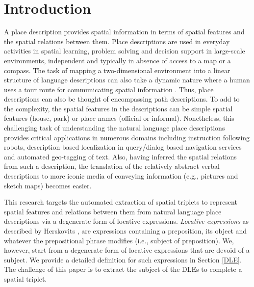 \documentclass{acm_proc_article-sp}
\begin{document}
\section{Introduction}
A place description provides spatial information in terms of spatial features and the spatial relations between them. Place descriptions are used in everyday activities in spatial learning, problem solving and decision support in large-scale environments, independent and typically in absence of access to a map or a compass. The task of mapping a two-dimensional environment into a linear structure of language descriptions can also take a dynamic nature where a human uses a tour route for communicating spatial information \cite{linde:spatial, daniel:modes}. Thus, place descriptions can also be thought of encompassing path descriptions. To add to the complexity, the spatial features in the descriptions can be simple spatial features (house, park) or place names (official or informal). Nonetheless, this challenging task of understanding the natural language place descriptions provides critical applications in numerous domains including instruction following robots, description based localization in query/dialog based navigation services and automated geo-tagging of text. Also, having inferred the spatial relations from such a description, the translation of the relatively abstract verbal descriptions to more iconic media of conveying information (e.g., pictures and sketch maps) becomes easier.

This research targets the automated extraction of spatial triplets to represent spatial features and relations between them from natural language place descriptions via a degenerate form of locative expressions. \textit{Locative expressions} as described by Herskovits \cite{herskovits:pragmatics}, are expressions containing a preposition, its object and whatever the prepositional phrase modifies (i.e., subject of preposition). We, however, start from a degenerate form of locative expressions that are devoid of a subject. We provide a detailed definition for such expressions in Section \ref{DLE}. The challenge of this paper is to extract the subject of the DLEs to complete a spatial triplet.
\end{document}
